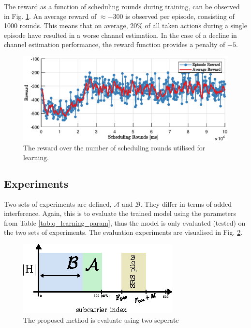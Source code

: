 The reward as a function of scheduling rounds during training, can be observed in Fig. \ref{fig:training_stats_qlearning}. An average reward of $\approx -300$ is observed per episode, consisting of 1000 rounds. This means that on average, $20\%$ of all taken actions during a single episode have resulted in a worse channel estimation. In the case of a decline in channel estimation performance, the reward function provides a penalty of $-5$. 
\begin{figure}
    \centering
    \includegraphics{chapters/part_uplink/figures/results/training_statistics.eps}
    \caption{The reward over the number of scheduling rounds utilised for learning. }\label{fig:training_stats_qlearning}
\end{figure}
\subsection{Experiments}
Two sets of experiments are defined, $\mathcal{A}$ and $\mathcal{B}$. They differ in terms of added interference. Again, this is to evaluate the trained model using the parameters from Table \ref{tab:q_learning_param}, thus the model is only evaluated (tested) on the two sets of experiments. The evaluation experiments are visualised in Fig. \ref{fig:subcarrier_index_experiment}.


\begin{figure}
    \centering
    \includegraphics{chapters/part_uplink/figures/subcarrier_index_experiment_setup.eps}
    \caption{The proposed method is evaluate using two seperate }
    \label{fig:subcarrier_index_experiment}
\end{figure}


